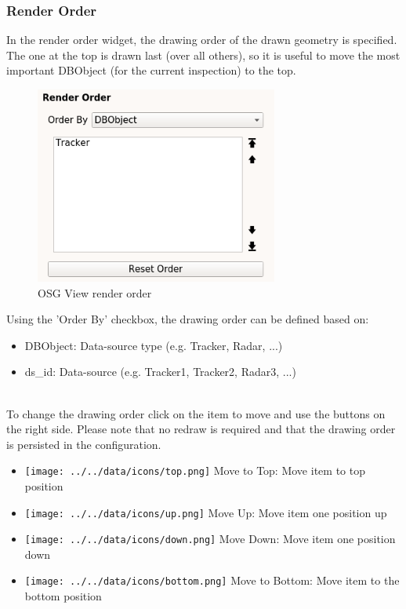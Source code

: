 \subsubsection{Render Order}

In the render order widget, the drawing order of the drawn geometry is specified. The one at the top is drawn last (over all others), so it is useful to move the most important DBObject (for the current inspection) to the top.

\begin{figure}[H]
    \includegraphics[width=8cm,frame]{../screenshots/osgview_render_order.png}
  \caption{OSG View render order}
\end{figure}

Using the 'Order By' checkbox, the drawing order can be defined based on:
\begin{itemize}
 \item DBObject: Data-source type (e.g. Tracker, Radar, ...)
 \item ds\_id: Data-source (e.g. Tracker1, Tracker2, Radar3, ...)
\end{itemize}
\ \\

To change the drawing order click on the item to move and use the buttons on the right side. Please note that no redraw is required and that the drawing order is persisted in the configuration. \\

 \begin{itemize}
 \item \texttt{[image: ../../data/icons/top.png]} Move to Top: Move item to top position
 \item \texttt{[image: ../../data/icons/up.png]} Move Up: Move item one position up
 \item \texttt{[image: ../../data/icons/down.png]} Move Down: Move item one position down
 \item \texttt{[image: ../../data/icons/bottom.png]} Move to Bottom: Move item to the bottom position
\end{itemize}
